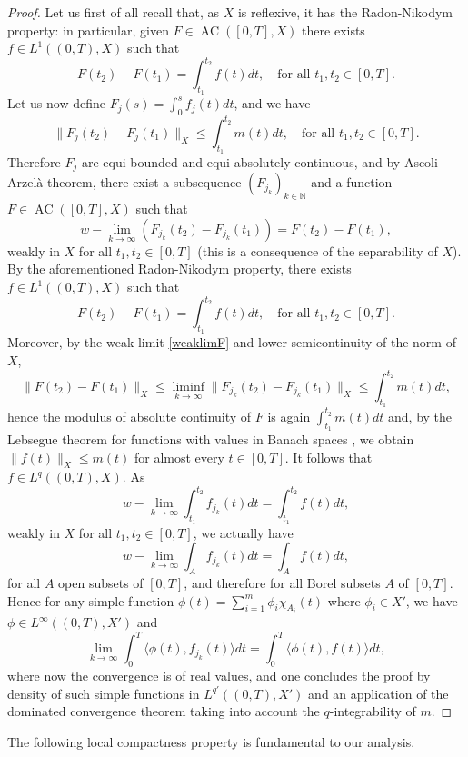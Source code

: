 \documentclass[11pt]{article}
\theoremstyle{plain}
\theoremstyle{definition}
\theoremstyle{remark}
\numberwithin{equation}{section}
\begin{document}
\begin{proof}
Let us first of all recall that, as $X$ is reflexive, it has the Radon-Nikodym property: in particular, given $F \in \operatorname{AC}([0,T],X)$ there exists
$f \in L^1((0,T),X)$ such that
$$
F(t_2)-F(t_1) = \int_{t_1}^{t_2} f(t) dt, \quad \mbox{for all } t_1,t_2 \in [0,T].
$$
Let us now define $F_j(s) = \int_0^s f_j(t) dt$, and we have 
$$
\| F_j(t_2) - F_j(t_1) \|_X \leq \int_{t_1}^{t_2} m(t) dt, \quad \mbox{for all } t_1,t_2 \in [0,T]. 
$$
Therefore $F_j$ are equi-bounded and equi-absolutely continuous, and by Ascoli-Arzel\`a theorem, there exist a subsequence 
$(F_{j_k})_{k \in \mathbb N}$ and a function $F \in \operatorname{AC}([0,T],X)$ such that 
\begin{equation}\label{weaklimF}
w-\lim_{k \to \infty} ( F_{j_k}(t_2) - F_{j_k}(t_1)) = F(t_2) - F(t_1),
\end{equation}
weakly in $X$ for all $t_1,t_2 \in [0,T]$ (this is a consequence of the separability of $X$). By the aforementioned Radon-Nikodym property, there exists
$f \in L^1((0,T),X)$ such that
$$
F(t_2)-F(t_1) = \int_{t_1}^{t_2} f(t) dt, \quad \mbox{for all } t_1,t_2 \in [0,T].
$$
Moreover, by the weak limit \eqref{weaklimF} and lower-semicontinuity of the norm of $X$,
$$
\| F(t_2)-F(t_1)\|_X \leq \liminf_{k \to \infty} \| F_{j_k}(t_2) - F_{j_k}(t_1) \|_X \leq \int_{t_1}^{t_2} m(t) dt,
$$
hence the modulus of absolute continuity of $F$ is again $\int_{t_1}^{t_2} m(t) dt$ and, by the Lebsegue theorem for
functions with values in Banach spaces \cite[2.9.9]{Fed69}, we obtain $\|f(t)\|_X \leq m(t)$ 
for almost every $t \in [0,T]$. It follows that $f \in L^q((0,T),X)$. As 
$$
w-\lim_{k \to \infty} \int_{t_1}^{t_2} f_{j_k}(t) dt = \int_{t_1}^{t_2} f(t) dt,
$$ 
weakly in $X$ for all $t_1,t_2 \in [0,T]$, we actually have
$$
w-\lim_{k \to \infty} \int_A f_{j_k}(t) dt = \int_A f(t) dt,
$$ 
for all $A$ open subsets of $[0,T]$, and therefore for all Borel subsets $A$ of $[0,T]$. Hence for any simple function
$\phi (t) = \sum_{i=1}^m \phi_i \chi_{A_i}(t)$ where $\phi_i \in X'$, we have $\phi \in L^\infty((0,T),X')$ and
$$
\lim_{k \to \infty} \int_0^T \langle \phi(t), f_{j_k}(t) \rangle dt = \int_0^T \langle \phi(t), f(t) \rangle dt,
$$ 
where now the convergence is of real values, and one concludes the proof by density of such simple functions in $L^{q'}((0,T),X')$
and an application of the dominated convergence theorem taking into account the $q$-integrability of $m$.
\end{proof}

The following local compactness property is fundamental to our analysis.
\end{document}
